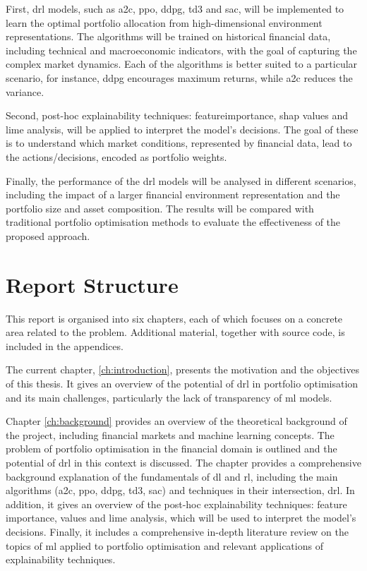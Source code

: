 First, \acrshort{drl} models, such as \acrfull{a2c}, \acrfull{ppo}, \acrfull{ddpg}, \acrfull{td3} and \acrfull{sac}, will be implemented to learn the optimal portfolio allocation from high-dimensional environment representations. The algorithms will be trained on historical financial data, including technical and macroeconomic indicators, with the goal of capturing the complex market dynamics. Each of the algorithms is better suited to a particular scenario, for instance, \acrshort{ddpg} encourages maximum returns, while \acrshort{a2c} reduces the variance.

Second, post-hoc explainability techniques: \Gls{featureimportance}, \acrfull{shap} values and \acrfull{lime} analysis, will be applied to interpret the model's decisions. The goal of these is to understand which market conditions, represented by financial data, lead to the actions/decisions, encoded as portfolio weights. 

Finally, the performance of the \acrshort{drl} models will be analysed in different scenarios, including the impact of a larger financial environment representation and the portfolio size and asset composition. The results will be compared with traditional portfolio optimisation methods to evaluate the effectiveness of the proposed approach.

\section{Report Structure} \label{sec:introduction-structure}

This report is organised into six chapters, each of which focuses on a concrete area related to the problem. Additional material, together with source code, is included in the appendices. 

The current chapter, \ref{ch:introduction}, presents the motivation and the objectives of this thesis. It gives an overview of the potential of \acrshort{drl} in portfolio optimisation and its main challenges, particularly the lack of transparency of \acrshort{ml} models. 

Chapter \ref{ch:background} provides an overview of the theoretical background of the project, including financial markets and machine learning concepts. The problem of portfolio optimisation in the financial domain is outlined and the potential of \acrshort{drl} in this context is discussed. The chapter provides a comprehensive background explanation of the fundamentals of \acrlong{dl} and \acrlong{rl}, including the main algorithms (\acrshort{a2c}, \acrshort{ppo}, \acrshort{ddpg}, \acrshort{td3}, \acrshort{sac}) and techniques in their intersection, \acrshort{drl}. In addition, it gives an overview of the post-hoc explainability techniques: feature importance,  values and \acrfull{lime} analysis, which will be used to interpret the model's decisions. Finally, it includes a comprehensive in-depth literature review on the topics of \acrshort{ml} applied to portfolio optimisation and relevant applications of explainability techniques. 

